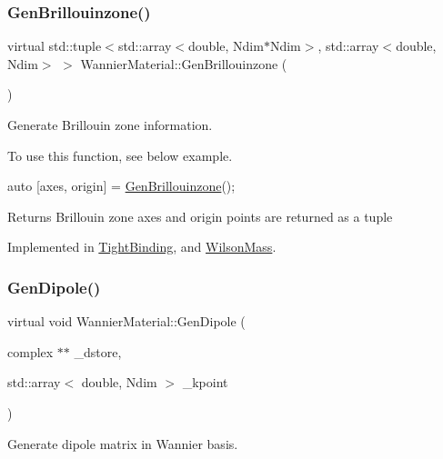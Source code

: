 \subsubsection{\texorpdfstring{Gen\+Brillouinzone()}{GenBrillouinzone()}}
{\footnotesize\ttfamily virtual std\+::tuple$<$std\+::array$<$double, Ndim$\ast$Ndim$>$, std\+::array$<$double, Ndim$>$ $>$ Wannier\+Material\+::\+Gen\+Brillouinzone (\begin{DoxyParamCaption}{ }\end{DoxyParamCaption})\hspace{0.3cm}{\ttfamily [pure virtual]}}



Generate Brillouin zone information. 

To use this function, see below example.
\begin{DoxyCode}
\textcolor{keyword}{auto} [axes, origin] = \hyperlink{class_wannier_material_af261bdc2dcb97e0b8c3a8d22d52d000a}{GenBrillouinzone}(); 
\end{DoxyCode}
 \begin{DoxyReturn}{Returns}
Brillouin zone axes and origin points are returned as a tuple 
\end{DoxyReturn}


Implemented in \hyperlink{class_tight_binding_a81458687424088fd6e549b861dc42ae4}{Tight\+Binding}, and \hyperlink{class_wilson_mass_a234ce32e40498a5516e48bd0ce315b4f}{Wilson\+Mass}.

\mbox{\label{class_wannier_material_a9a5087fbcae395f007d77968f9d00d46}} 
\subsubsection{\texorpdfstring{Gen\+Dipole()}{GenDipole()}}
{\footnotesize\ttfamily virtual void Wannier\+Material\+::\+Gen\+Dipole (\begin{DoxyParamCaption}\item[{complex $\ast$$\ast$}]{\+\_\+dstore,  }\item[{std\+::array$<$ double, Ndim $>$}]{\+\_\+kpoint }\end{DoxyParamCaption})\hspace{0.3cm}{\ttfamily [pure virtual]}}



Generate dipole matrix in Wannier basis. 



